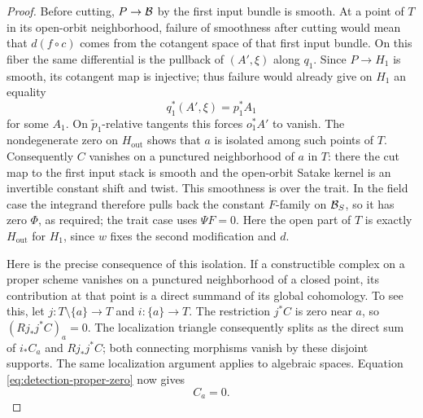 \begin{proof}
Before cutting, $P\to\mathcal B$ by the first input bundle is smooth.  At a
point of $T$ in its open-orbit neighborhood, failure of smoothness after
cutting would mean that $d(f\circ c)$ comes from the cotangent space of
that first input bundle.  On this fiber the same differential is the
pullback of $(A',\xi)$ along $q_1$.  Since $P\to H_1$ is smooth, its
cotangent map is injective; thus failure would already give on $H_1$
an equality
\[
                         q_1^*(A',\xi)=p_1^*A_1
\]
for some $A_1$.  On $\widetilde p_1$-relative tangents this forces
$o_1^*A'$ to vanish.  The nondegenerate zero on $H_{\mathrm{out}}$
shows that $a$ is isolated among such points of $T$.  Consequently $C$
vanishes on a punctured neighborhood of $a$ in $T$: there the cut map
to the first input stack is smooth and the open-orbit Satake kernel is
an invertible constant shift and twist.
This smoothness is over the trait.  In the field case the integrand
therefore pulls back the constant $F$-family on $\mathcal B_S$, so it has zero
$\Phi$, as required; the trait case uses $\Psi F=0$.
Here the open part of $T$ is exactly $H_{\mathrm{out}}$ for $H_1$,
since $w$ fixes the second modification and $d$.

Here is the precise consequence of this isolation.  If a constructible
complex on a proper scheme vanishes on a punctured neighborhood of a
closed point, its contribution at that point is a direct summand of its
global cohomology.  To see this, let $j:T\setminus\{a\}\to T$ and
$i:\{a\}\to T$.  The restriction $j^*C$ is zero near $a$, so
$(Rj_*j^*C)_a=0$.  The localization triangle consequently splits as the
direct sum of $i_*C_a$ and $Rj_*j^*C$; both connecting morphisms vanish
by these disjoint supports.  The same localization argument applies
to algebraic spaces.  Equation
\eqref{eq:detection-proper-zero} now gives
\begin{equation}\label{eq:detection-vertex-zero}
                                  C_a=0.
\end{equation}


\end{proof}
